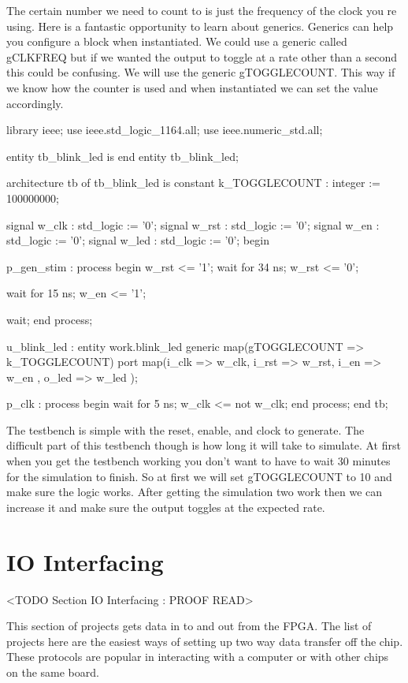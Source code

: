 The certain number we need to count to is just the frequency of the clock you re using. Here is a fantastic opportunity to learn about generics. Generics can help you configure a block when instantiated. We could use a generic called gCLKFREQ but if we wanted the output to toggle at a rate other than a second this could be confusing. We will use the generic gTOGGLECOUNT. This way if we know how the counter is used and when instantiated we can set the value accordingly.
	
\begin{VHDLlisting}[tabsize=8]
library ieee;
  use ieee.std_logic_1164.all;
  use ieee.numeric_std.all;
  
entity tb_blink_led is
end entity tb_blink_led;

architecture tb of tb_blink_led is
	constant k_TOGGLECOUNT : integer := 100000000;

	signal w_clk : std_logic := '0';
	signal w_rst : std_logic := '0';
	signal w_en  : std_logic := '0';
	signal w_led : std_logic := '0';
begin

	p_gen_stim : process
	begin
		w_rst <= '1';
		wait for 34 ns;
		w_rst <= '0';
		
		wait for 15 ns;
		w_en <= '1';
		
		wait;
	end process;

	u_blink_led : entity work.blink_led
	generic map(gTOGGLECOUNT => k_TOGGLECOUNT)
	port map(i_clk   => w_clk,
		     i_rst   => w_rst,
		     i_en    => w_en ,
		     o_led   => w_led
	);

	p_clk : process
	begin
		wait for 5 ns;
		w_clk <= not w_clk;
	end process;	
end tb;
\end{VHDLlisting}

The testbench is simple with the reset, enable, and clock to generate. The difficult part of this testbench though is how long it will take to simulate. At first when you get the testbench working you don't want to have to wait 30 minutes for the simulation to finish. So at first we will set gTOGGLECOUNT to 10 and make sure the logic works. After getting the simulation two work then we can increase it and make sure the output toggles at the expected rate. 

\section{IO Interfacing}
	<TODO Section IO Interfacing : PROOF READ>
	
This section of projects gets data in to and out from the \ac{FPGA}. The list of projects here are the easiest ways of setting up two way data transfer off the chip. These protocols are popular in interacting with a computer or with other chips on the same board.

